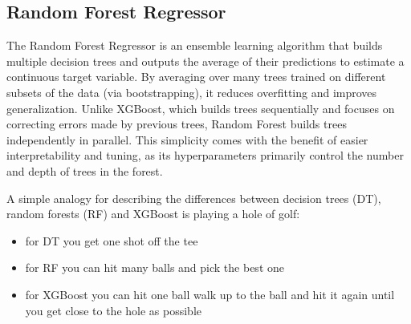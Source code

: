 

\subsection{Random Forest Regressor}

The Random Forest Regressor is an ensemble learning algorithm that builds multiple decision trees and outputs the average of their predictions to estimate a continuous target variable. By averaging over many trees trained on different subsets of the data (via bootstrapping), it reduces overfitting and improves generalization. Unlike XGBoost, which builds trees sequentially and focuses on correcting errors made by previous trees, Random Forest builds trees independently in parallel. This simplicity comes with the benefit of easier interpretability and tuning, as its hyperparameters primarily control the number and depth of trees in the forest.

A simple analogy for describing the differences between decision trees (DT), random forests (RF) and XGBoost is playing a hole of golf: 
\begin{itemize}
    \item for DT you get one shot off the tee
    \item for RF you can hit many balls and pick the best one
    \item for XGBoost you can hit one ball walk up to the ball and hit it again until you get close to the hole as possible
\end{itemize}

    

